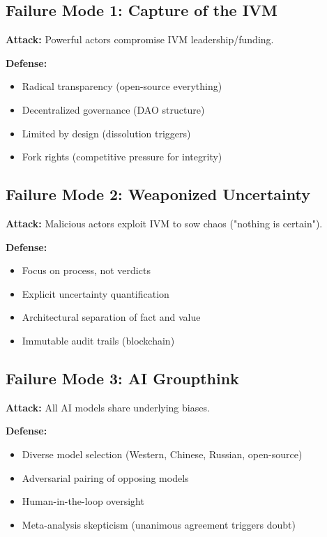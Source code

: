 \documentclass[11pt,a4paper]{article}
\theoremstyle{definition}
\theoremstyle{remark}
\begin{document}
\begin{small}
\subsection{Failure Mode 1: Capture of the IVM}

\textbf{Attack:} Powerful actors compromise IVM leadership/funding.

\textbf{Defense:}
\begin{itemize}
\item Radical transparency (open-source everything)
\item Decentralized governance (DAO structure)
\item Limited by design (dissolution triggers)
\item Fork rights (competitive pressure for integrity)
\end{itemize}

\subsection{Failure Mode 2: Weaponized Uncertainty}

\textbf{Attack:} Malicious actors exploit IVM to sow chaos ("nothing is certain").

\textbf{Defense:}
\begin{itemize}
\item Focus on process, not verdicts
\item Explicit uncertainty quantification
\item Architectural separation of fact and value
\item Immutable audit trails (blockchain)
\end{itemize}

\subsection{Failure Mode 3: AI Groupthink}

\textbf{Attack:} All AI models share underlying biases.

\textbf{Defense:}
\begin{itemize}
\item Diverse model selection (Western, Chinese, Russian, open-source)
\item Adversarial pairing of opposing models
\item Human-in-the-loop oversight
\item Meta-analysis skepticism (unanimous agreement triggers doubt)
\end{itemize}


\end{small}
\end{document}
